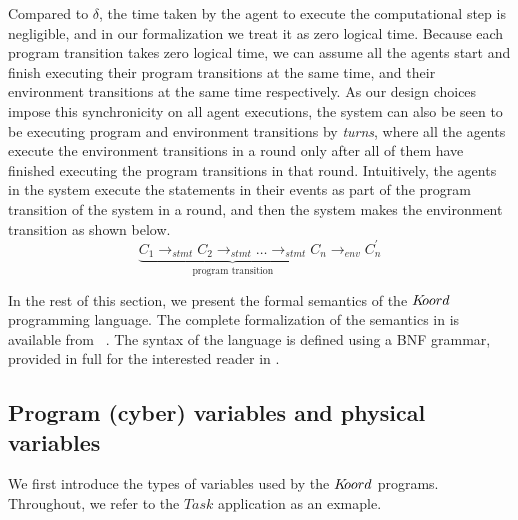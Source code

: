 
Compared to $\delta$, the time taken by the agent to execute the computational step is negligible, and in our formalization we treat it as zero logical time. Because each program transition takes zero logical time, we can assume all the agents start and finish executing their program transitions at the same time, and their environment transitions at the same time respectively. As our design choices impose this synchronicity on all agent executions, the system can also be seen to be executing program and environment transitions by \emph{turns}, where all the agents execute the environment transitions in a round only after all of them have finished executing the program transitions in that round. Intuitively, the agents in the system execute the statements in their events as part of the program transition of the system in a round, and then the system makes the environment transition as shown below. 
$$
\underbrace{C_1\rightarrow_{stmt} C_2\rightarrow_\mathit{stmt}\ldots \rightarrow_{stmt}C_n}_{\mbox{program transition}}\rightarrow_\mathit{env} C^\prime_n
$$


 In the rest of this section, we present the formal semantics of the $K\kern-2pt oord$ programming language. The complete formalization of the semantics in \K is available from~\cite{} . The syntax of the language is defined using a BNF grammar, provided in full for the interested reader in .
 
\subsection{Program (cyber) variables and physical variables}
\label{sec:variables}
We first introduce the types of variables used by the $K\kern-2pt oord$ programs. Throughout, we refer to the $\mathit{Task}$ application as an exmaple.

